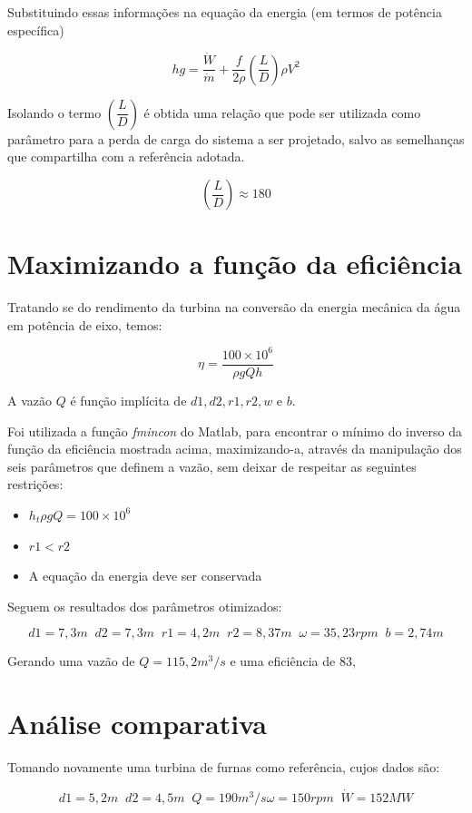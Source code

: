 Substituindo essas informações na equação da energia (em termos de potência específica)

\[hg = \dfrac{\dot{W}}{\dot{m}} + \dfrac{f}{2\rho}\left(\dfrac{L}{D}\right)\rho V^2\]

Isolando o termo $\left(\dfrac{L}{D}\right)$ é obtida uma relação que pode ser utilizada como parâmetro para a perda de carga do sistema a ser projetado, salvo as semelhanças que compartilha com a referência adotada.

\[\left(\dfrac{L}{D}\right) \approx 180\]

\section{Maximizando a função da eficiência}

Tratando se do rendimento da turbina na conversão da energia mecânica da água em potência de eixo, temos:

\[\eta = \dfrac{100\times10^6}{\rho gQh}\]

A vazão $Q$ é função implícita de $d1, d2, r1, r2, w$ e $b$.

Foi utilizada a função \textit{fmincon} do Matlab, para encontrar o mínimo do inverso da função da eficiência mostrada acima, maximizando-a, através da manipulação dos seis parâmetros que definem a vazão, sem deixar de respeitar as seguintes restrições:

\begin{itemize}
    \item $h_t \rho g Q = 100\times10^6$
    \item $r1<r2$
    \item A equação da energia deve ser conservada
\end{itemize}

Seguem os resultados dos parâmetros otimizados:

\[d1 = 7,3m \;\;  d2 = 7,3m  \;\; r1 = 4,2m \;\;  r2 = 8,37m  \;\;  \omega = 35,23rpm  \;\;  b = 2,74m\]

Gerando uma vazão de $Q = 115,2m^3/s$ e uma eficiência de $83,$

\section{Análise comparativa}

Tomando novamente uma turbina de furnas como referência, cujos dados são:

\[d1 = 5,2m \;\; d2 = 4,5m \;\; Q = 190m^3/s \omega = 150rpm \;\; \dot{W} = 152MW\]

